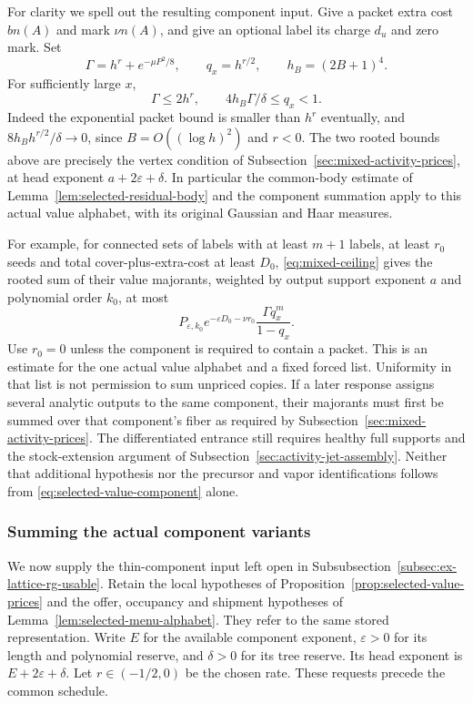 For clarity we spell out the resulting component input. Give a packet
extra cost $bn(A)$ and mark $\nu n(A)$, and give an optional label its
charge $d_u$ and zero mark. Set
\[
 \Gamma=h^r+e^{-\mu P^2/8},\qquad
 q_x=h^{r/2},\qquad h_B=(2B+1)^4.
\]
For sufficiently large $x$,
\begin{equation}\label{eq:selected-value-tree}
 \Gamma\le2h^r,\qquad
       4h_B\Gamma/\delta\le q_x<1.
\end{equation}
Indeed the exponential packet bound is smaller than $h^r$ eventually,
and $8h_Bh^{r/2}/\delta\to0$, since $B=O((\log h)^2)$ and $r<0$.
The two rooted bounds above are precisely the vertex condition of
Subsection~\ref{sec:mixed-activity-prices}, at head exponent
$a+2\varepsilon+\delta$. In particular the common-body estimate of
Lemma~\ref{lem:selected-residual-body} and the component summation
apply to this actual value alphabet, with its original Gaussian and
Haar measures.

For example, for connected sets of labels with at least $m+1$ labels,
at least $r_0$ seeds and total cover-plus-extra-cost at least $D_0$,
\eqref{eq:mixed-ceiling} gives the rooted sum of their value majorants,
weighted by output support exponent $a$ and polynomial order $k_0$,
at most
\begin{equation}\label{eq:selected-value-component}
 P_{\varepsilon,k_0}e^{-\varepsilon D_0-\nu r_0}
                         \frac{\Gamma q_x^m}{1-q_x}.
\end{equation}
Use $r_0=0$ unless the component is required to contain a packet.
This is an estimate for the one actual value alphabet and a fixed forced
list. Uniformity in that list is not permission to sum unpriced copies.
If a later response assigns several analytic outputs to the same
component, their majorants must first be summed over that component's
fiber as required by Subsection~\ref{sec:mixed-activity-prices}.
The differentiated entrance still requires healthy full supports and
the stock-extension argument of Subsection~\ref{sec:activity-jet-assembly}.
Neither that additional hypothesis nor the precursor and vapor
identifications follows from \eqref{eq:selected-value-component} alone.

\subsubsection{Summing the actual component variants}
\label{sec:selected-component-variants}

We now supply the thin-component input left open in
Subsubsection~\ref{subsec:ex-lattice-rg-usable}. Retain the local hypotheses
of Proposition~\ref{prop:selected-value-prices} and the offer, occupancy
and shipment hypotheses of Lemma~\ref{lem:selected-menu-alphabet}.
They refer to the same stored representation. Write $E$ for the
available component exponent, $\varepsilon>0$ for its length and
polynomial reserve, and $\delta>0$ for its tree reserve. Its head
exponent is $E+2\varepsilon+\delta$. Let $r\in(-1/2,0)$ be the
chosen rate. These requests precede the common schedule.

